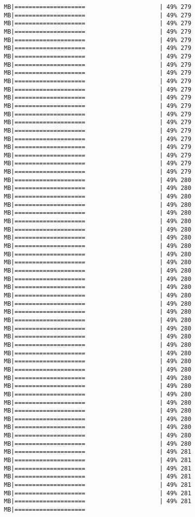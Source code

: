 \documentclass[
]{article}
\begin{document}
\begin{verbatim}
MB|====================                     | 49% 279 MB|====================                     | 49% 279 MB|====================                     | 49% 279 MB|====================                     | 49% 279 MB|====================                     | 49% 279 MB|====================                     | 49% 279 MB|====================                     | 49% 279 MB|====================                     | 49% 279 MB|====================                     | 49% 279 MB|====================                     | 49% 279 MB|====================                     | 49% 279 MB|====================                     | 49% 279 MB|====================                     | 49% 279 MB|====================                     | 49% 279 MB|====================                     | 49% 279 MB|====================                     | 49% 279 MB|====================                     | 49% 279 MB|====================                     | 49% 279 MB|====================                     | 49% 279 MB|====================                     | 49% 279 MB|====================                     | 49% 279 MB|====================                     | 49% 280 MB|====================                     | 49% 280 MB|====================                     | 49% 280 MB|====================                     | 49% 280 MB|====================                     | 49% 280 MB|====================                     | 49% 280 MB|====================                     | 49% 280 MB|====================                     | 49% 280 MB|====================                     | 49% 280 MB|====================                     | 49% 280 MB|====================                     | 49% 280 MB|====================                     | 49% 280 MB|====================                     | 49% 280 MB|====================                     | 49% 280 MB|====================                     | 49% 280 MB|====================                     | 49% 280 MB|====================                     | 49% 280 MB|====================                     | 49% 280 MB|====================                     | 49% 280 MB|====================                     | 49% 280 MB|====================                     | 49% 280 MB|====================                     | 49% 280 MB|====================                     | 49% 280 MB|====================                     | 49% 280 MB|====================                     | 49% 280 MB|====================                     | 49% 280 MB|====================                     | 49% 280 MB|====================                     | 49% 280 MB|====================                     | 49% 280 MB|====================                     | 49% 280 MB|====================                     | 49% 280 MB|====================                     | 49% 280 MB|====================                     | 49% 280 MB|====================                     | 49% 281 MB|====================                     | 49% 281 MB|====================                     | 49% 281 MB|====================                     | 49% 281 MB|====================                     | 49% 281 MB|====================                     | 49% 281 MB|====================                     | 49% 281 MB|====================  
\end{verbatim}
\end{document}
